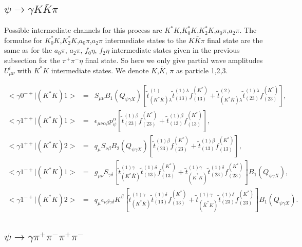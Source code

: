 \subsection{$\psi\to\gamma K\bar K\pi$}

Possible intermediate channels for this process are
$K^*K$,$K_0^*K$,$K^*_2K$,$a_0\pi$,$a_2\pi$. The formulae for
$K_0^*K$,$K^*_2K$,$a_0\pi$,$a_2\pi$ intermediate states to the
$K\bar K\pi$ final state are the same as for the $a_0\pi$,
$a_2\pi$, $f_0\eta$, $f_2\eta$ intermediate states given in the
previous subsection for the $\pi^+\pi^-\eta$ final state. So here
we only give partial wave amplitudes $U^i_{\mu\nu}$ with $K^*K$
intermediate states. We denote $K$,$\bar K$, $\pi$ as particle
1,2,3.

\begin{eqnarray}
<\gamma 0^{-+}|(K^*K)1> \!&=&\! S_{\mu\nu} B_1(Q_{\psi\gamma X})
[\tilde t^{(1)}_{(K^*\bar K)\lambda} \tilde
t^{(1)\lambda}_{(13)}f_{(13)}^{(K^*)}+\tilde t^{(2)}_{(K^*\bar
K)\lambda} \tilde t^{(1)\lambda}_{(23)}f_{(23)}^{(K^*)}],\\
<\gamma 1^{++}|(K^*K)1> \!&=&\!
\epsilon_{\mu\nu\alpha\beta}p_\psi^{\alpha} [\tilde
t_{(23)}^{(1)\beta}f_{(23)}^{(K^*)}+\tilde
t_{(13)}^{(1)\beta}f_{(13)}^{(K^*)}], \\
<\gamma 1^{++}|(K^*K)2> \!&=&\! q_\mu S_{\nu\beta}
B_2(Q_{\psi\gamma X}) [\tilde t_{(23)}^{(1)\beta}
f_{(23)}^{(K^*)}+\tilde t_{(13)}^{(1)\beta}
f_{(13)}^{(K^*)}], \\
<\gamma 1^{-+}|(K^*K)1> \!&=&\! g_{\mu\nu}S_{\gamma\delta} [\tilde
t^{(1)\gamma}_{(K^*\bar K)}\tilde
t^{(1)\delta}_{(13)}f_{(13)}^{(K^*)}+\tilde t^{(1)\gamma}_{(\bar
K^*K )} \tilde
t^{(1)\delta}_{(23)}f_{(23)}^{(K^*)}]B_1(Q_{\psi\gamma X}),
\\
<\gamma 1^{-+}|(K^*K)2> \!&=&\! q_\mu
\epsilon_{\nu\beta\gamma\delta}K^\beta [\tilde
t^{(1)\gamma}_{(K^*\bar K)}\tilde
t^{(1)\delta}_{(13)}f_{(13)}^{(K^*)}+\tilde t^{(1)\gamma}_{(\bar
K^*K )} \tilde
t^{(1)\delta}_{(23)}f_{(23)}^{(K^*)}]B_1(Q_{\psi\gamma X}).
\end{eqnarray}

\subsection{$\psi\to\gamma \pi^+\pi^-\pi^+\pi^-$}

